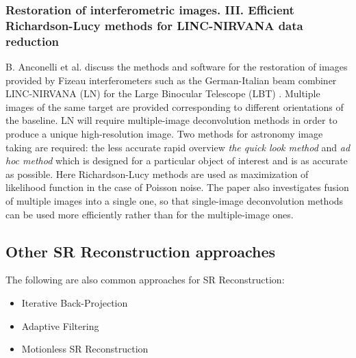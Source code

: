 \subsubsection{Restoration of interferometric images. III. Efficient Richardson-Lucy methods for LINC-NIRVANA data reduction}  \label{sec7}
B. Anconelli et al. discuss the methods and software for the restoration of images provided by Fizeau interferometers such as the German-Italian beam combiner LINC-NIRVANA (LN) for the Large Binocular Telescope (LBT) \cite{Anconelli2005}. Multiple images of the same target are provided corresponding to different orientations of the baseline. LN will require multiple-image deconvolution methods in order to produce a unique high-resolution image. Two methods for astronomy image taking are required: the less accurate rapid overview \textit{the quick look method} and \textit{ad hoc method} which is designed for a particular object of interest and is as accurate as possible. Here Richardson-Lucy methods are used as maximization of likelihood function in the case of Poisson noise. The paper also investigates fusion of multiple images into a single one, so that single-image deconvolution methods can be used more efficiently rather than for the multiple-image ones. 

\subsection{Other SR Reconstruction approaches}
The following are also common approaches for SR Reconstruction:
\begin{itemize}
\item Iterative Back-Projection
\item Adaptive Filtering
\item Motionless SR Reconstruction
\end{itemize}